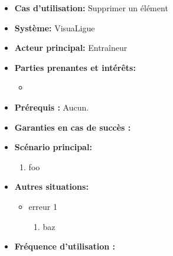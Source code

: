 \begin{itemize}
    \item \textbf{Cas d'utilisation:} Supprimer un \'el\'ement
    \item \textbf{Syst\`eme:} VisuaLigue
    \item \textbf{Acteur principal:} Entra\^ineur
    \item \textbf{Parties prenantes et int\'er\^ets:}
    	\begin{itemize}
    		\item
    	\end{itemize}
    \item \textbf{Pr\'erequis :} Aucun.
    \item \textbf{Garanties en cas de succ\`es :}
    \item \textbf{Sc\'enario principal:}
        \begin{enumerate}
            \item foo
        \end{enumerate}
    \item \textbf{Autres situations:}
        \begin{itemize}
            \item erreur 1
                \begin{enumerate}
                    \item baz
                \end{enumerate}
        \end{itemize}
    \item \textbf{Fréquence d'utilisation :}
\end{itemize}




